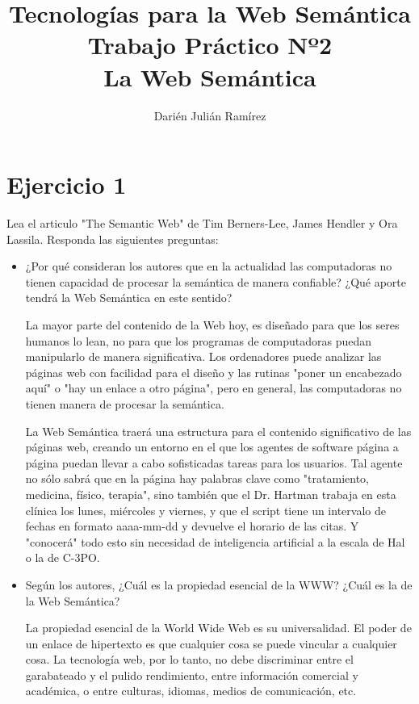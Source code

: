 \documentclass[a4paper,12pt,oneside,final,spanish]{article}
\title{\Huge Tecnologías para la Web Semántica\\
Trabajo Práctico Nº2\\
La Web Semántica}
\author{Darién Julián Ramírez}
\date{\vspace{-5ex}}
\begin{document}
\maketitle %

\section{Ejercicio 1}

Lea el articulo "The Semantic Web" de Tim Berners-Lee, James Hendler y Ora Lassila. Responda las siguientes preguntas: 

\begin{itemize}
\item ¿Por qué consideran los autores que en la actualidad las computadoras no tienen capacidad de procesar la semántica de manera confiable? ¿Qué aporte tendrá la Web Semántica en este sentido? 

La mayor parte del contenido de la Web hoy, es diseñado para que los seres humanos lo lean, no para que los programas de computadoras puedan manipularlo de manera significativa. Los ordenadores puede analizar las páginas web con facilidad para el diseño y las rutinas "poner un encabezado aquí" o "hay un enlace a otro página", pero en general, las computadoras no tienen manera de procesar la semántica.

La Web Semántica traerá una estructura para el contenido significativo de las páginas web, creando un entorno en el que los agentes de software página a página puedan llevar a cabo sofisticadas tareas para los usuarios. Tal agente no sólo sabrá que en la página hay palabras clave como "tratamiento, medicina, físico, terapia", sino también que el Dr. Hartman trabaja en esta clínica los lunes, miércoles y viernes, y que el script tiene un intervalo de fechas en formato aaaa-mm-dd y devuelve el horario de las citas. Y "conocerá" todo esto sin necesidad de inteligencia artificial a la escala de Hal o la de C-3PO.

\item Según los autores, ¿Cuál es la propiedad esencial de la WWW? ¿Cuál es la de la Web Semántica?

La propiedad esencial de la World Wide Web es su universalidad. El poder de un enlace de hipertexto es que cualquier cosa se puede vincular a cualquier cosa. La tecnología web, por lo tanto, no debe discriminar entre el garabateado y el pulido rendimiento, entre información comercial y académica, o entre culturas, idiomas, medios de comunicación, etc.


\end{itemize}
\end{document}

